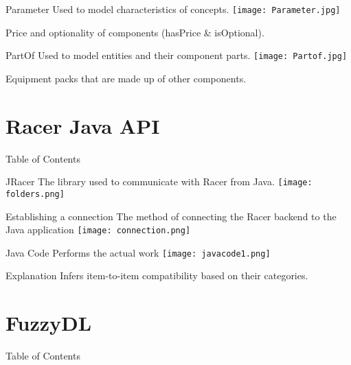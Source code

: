 \documentclass{beamer}
\begin{document}
\begin{frame}{Parameter}
    Used to model characteristics of concepts.
    \texttt{[image: Parameter.jpg]}
    \begin{examples}
        Price and optionality of components (hasPrice \& isOptional).
    \end{examples}
\end{frame}

\begin{frame}{PartOf}
    Used to model entities and their component parts.
    \texttt{[image: Partof.jpg]}
    \begin{examples}
        Equipment packs that are made up of other components.
    \end{examples}
\end{frame}

\section{Racer Java API}
\begin{frame}{Table of Contents}
    \tableofcontents[currentsection]
\end{frame}

\begin{frame}{JRacer}
    The library used to communicate with Racer from Java.
    \texttt{[image: folders.png]}
\end{frame}

\begin{frame}{Establishing a connection}
    The method of connecting the Racer backend to the Java application
    \texttt{[image: connection.png]}
\end{frame}

\begin{frame}{Java Code}
    Performs the actual work
    \texttt{[image: javacode1.png]}
    \begin{block}{Explanation}
        Infers item-to-item compatibility based on their categories.
    \end{block}
\end{frame}

\section{FuzzyDL}
\begin{frame}{Table of Contents}
    \tableofcontents[currentsection]
\end{frame}
\end{document}
